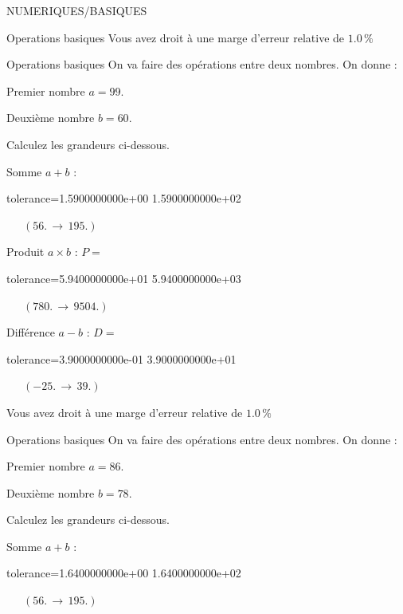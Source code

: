 \documentclass[12pt]{article}
\begin{document}
\begin{quiz}{NUMERIQUES/BASIQUES}
\begin{cloze}{Operations basiques}
Vous avez droit à une marge d'erreur relative de $1.0\, \% $

\end{cloze} 


 \begin{cloze}{Operations basiques} 
On va faire des opérations entre deux nombres. On donne :

Premier nombre $a = 99.\, $

Deuxième nombre $b = 60.\, $

 

Calculez les grandeurs ci-dessous.

Somme $ a + b $ : 
\begin{numerical}[points=1] 
\item[tolerance={1.5900000000e+00}] 1.5900000000e+02 
\end{numerical} 
 $\,$ 
 $ \quad (56. \, \rightarrow \, 195.) $ 

Produit $ a \times b $ : $P =  $
\begin{numerical}[points=1] 
\item[tolerance={5.9400000000e+01}] 5.9400000000e+03 
\end{numerical} 
 $\,$ 
 $ \quad (780. \, \rightarrow \, 9504.) $ 

Différence $ a - b $ : $D =  $
\begin{numerical}[points=1] 
\item[tolerance={3.9000000000e-01}] 3.9000000000e+01 
\end{numerical} 
 $\,$ 
 $ \quad (-25. \, \rightarrow \, 39.) $ 

Vous avez droit à une marge d'erreur relative de $1.0\, \% $

\end{cloze} 


 \begin{cloze}{Operations basiques} 
On va faire des opérations entre deux nombres. On donne :

Premier nombre $a = 86.\, $

Deuxième nombre $b = 78.\, $

 

Calculez les grandeurs ci-dessous.

Somme $ a + b $ : 
\begin{numerical}[points=1] 
\item[tolerance={1.6400000000e+00}] 1.6400000000e+02 
\end{numerical} 
 $\,$ 
 $ \quad (56. \, \rightarrow \, 195.) $ 


\end{cloze}
\end{quiz}
\end{document}
